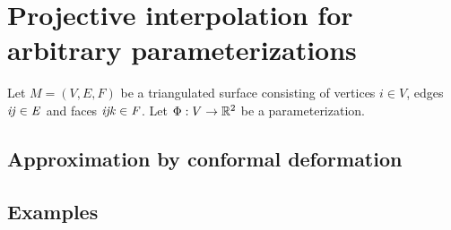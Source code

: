 \section[Projective interpolation for arbitrary parameterizations] %
{Projective interpolation for arbitrary parameterizations %
}

Let $M=(V, E, F)$ be a triangulated surface consisting of vertices $i\in V$, edges $\it{ij}\in E$ and faces
$\it{ijk}\in F$. Let $\Phi : V \to \mathbb R^2$ be a parameterization.



\subsection{Approximation by conformal deformation}
\subsection{Examples}

